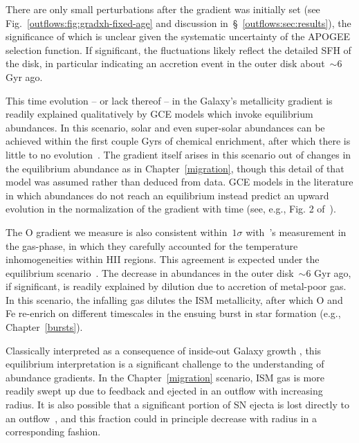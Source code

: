 There are only small perturbations after the gradient was initially set (see
Fig.~\ref{outflows:fig:gradxh-fixed-age} and discussion
in~\S~\ref{outflows:sec:results}), the significance of which is unclear given
the systematic uncertainty of the APOGEE selection function.
If significant, the fluctuations likely reflect the detailed SFH of the disk,
in particular indicating an accretion event in the outer disk about~$\sim$6 Gyr
ago.
\par
This time evolution -- or lack thereof -- in the Galaxy's metallicity gradient
is readily explained qualitatively by GCE models which invoke equilibrium
abundances.
In this scenario, solar and even super-solar abundances can be achieved within
the first couple Gyrs of chemical enrichment, after which there is little to no
evolution~\citep[e.g.,][]{Larson1972, Weinberg2017b}.
The gradient itself arises in this scenario out of changes in the
equilibrium abundance as in Chapter~\ref{migration}, though this detail of that
model was assumed rather than deduced from data.
GCE models in the literature in which abundances do not reach an equilibrium
instead predict an upward evolution in the normalization of the gradient with
time (see, e.g., Fig. 2 of~\citealt{Minchev2013}).
\par
The O gradient we measure is also consistent within~$1\sigma$
with~\citet{MendezDelgado2022}'s \citet{MendezDelgado2022} measurement in the
gas-phase, in which they carefully accounted for the temperature
inhomogeneities within HII regions.
This agreement is expected under the equilibrium scenario~\citep{Weinberg2017b}.
The decrease in abundances in the outer disk~$\sim$6 Gyr ago, if significant,
is readily explained by dilution due to accretion of metal-poor gas.
In this scenario, the infalling gas dilutes the ISM metallicity, after which O
and Fe re-enrich on different timescales in the ensuing burst
in star formation (e.g., Chapter~\ref{bursts}).
\par
Classically interpreted as a consequence of inside-out Galaxy growth
\citep{Kauffmann1996}, this equilibrium interpretation is a significant
challenge to the understanding of abundance gradients.
In the Chapter~\ref{migration} scenario, ISM gas is more readily swept up due
to feedback and ejected in an outflow with increasing radius.
It is also possible that a significant portion of SN ejecta is lost directly to
an outflow~\citep{Dalcanton2007, Peeples2011, Christensen2018, Chisholm2018,
Cameron2021}, and this fraction could in principle decrease with radius in a
corresponding fashion.
